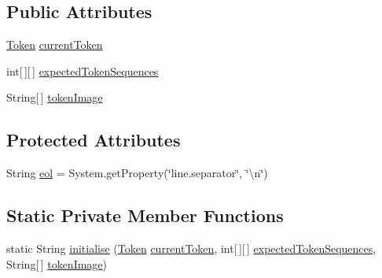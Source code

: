 \subsection*{Public Attributes}
\begin{DoxyCompactItemize}
\item 
\hyperlink{classuk_1_1ac_1_1manchester_1_1cs_1_1owlapi_1_1dlsyntax_1_1parser_1_1_token}{Token} \hyperlink{classuk_1_1ac_1_1manchester_1_1cs_1_1owlapi_1_1dlsyntax_1_1parser_1_1_parse_exception_a77cb9a5a197a595304a92f835f6ab8e8}{current\-Token}
\item 
int\mbox{[}$\,$\mbox{]}\mbox{[}$\,$\mbox{]} \hyperlink{classuk_1_1ac_1_1manchester_1_1cs_1_1owlapi_1_1dlsyntax_1_1parser_1_1_parse_exception_a20be33759c6cb15eb280f0083b192a77}{expected\-Token\-Sequences}
\item 
String\mbox{[}$\,$\mbox{]} \hyperlink{classuk_1_1ac_1_1manchester_1_1cs_1_1owlapi_1_1dlsyntax_1_1parser_1_1_parse_exception_aac8150e07741c09056e6485d62785271}{token\-Image}
\end{DoxyCompactItemize}
\subsection*{Protected Attributes}
\begin{DoxyCompactItemize}
\item 
String \hyperlink{classuk_1_1ac_1_1manchester_1_1cs_1_1owlapi_1_1dlsyntax_1_1parser_1_1_parse_exception_a098af97940c05110614cd947aea31c91}{eol} = System.\-get\-Property(\char`\"{}line.\-separator\char`\"{}, \char`\"{}\textbackslash{}n\char`\"{})
\end{DoxyCompactItemize}
\subsection*{Static Private Member Functions}
\begin{DoxyCompactItemize}
\item 
static String \hyperlink{classuk_1_1ac_1_1manchester_1_1cs_1_1owlapi_1_1dlsyntax_1_1parser_1_1_parse_exception_a0b1118014d8b030a1bb11a63fff74487}{initialise} (\hyperlink{classuk_1_1ac_1_1manchester_1_1cs_1_1owlapi_1_1dlsyntax_1_1parser_1_1_token}{Token} \hyperlink{classuk_1_1ac_1_1manchester_1_1cs_1_1owlapi_1_1dlsyntax_1_1parser_1_1_parse_exception_a77cb9a5a197a595304a92f835f6ab8e8}{current\-Token}, int\mbox{[}$\,$\mbox{]}\mbox{[}$\,$\mbox{]} \hyperlink{classuk_1_1ac_1_1manchester_1_1cs_1_1owlapi_1_1dlsyntax_1_1parser_1_1_parse_exception_a20be33759c6cb15eb280f0083b192a77}{expected\-Token\-Sequences}, String\mbox{[}$\,$\mbox{]} \hyperlink{classuk_1_1ac_1_1manchester_1_1cs_1_1owlapi_1_1dlsyntax_1_1parser_1_1_parse_exception_aac8150e07741c09056e6485d62785271}{token\-Image})
\end{DoxyCompactItemize}
